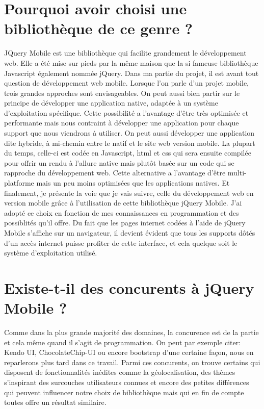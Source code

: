 \documentclass[a4paper,11pt,oneside]{sphinxmanual}
\begin{document}
\section{Pourquoi avoir choisi une bibliothèque de ce genre ?}
\label{presentation_jQM:pourquoi-avoir-choisi-une-bibliotheque-de-ce-genre}
JQuery Mobile est une bibliothèque qui facilite grandement le développement web.
Elle a été mise sur pieds par la même maison que la si fameuse bibliothèque
Javascript également nommée jQuery. Dans ma partie du projet, il est avant tout
question de développement web mobile. Lorsque l'on parle d'un projet mobile, trois
grandes approches sont envisageables. On peut aussi bien partir sur le principe
de développer une application native, adaptée à un système d'exploitation spécifique.
Cette possibilité a l'avantage d'être très optimisée et performante mais nous
contraint à développer une application pour chaque support que nous viendrons
à utiliser. On peut aussi développer une application dite hybride, à mi-chemin entre le natif et
le site web version mobile. La plupart du temps, celle-ci est codée en Javascript,
html et css qui sera ensuite compilée pour offrir un rendu à l'allure native mais
plutôt basée sur un code qui se rapproche du développement web. Cette alternative
a l'avantage d'être multi-platforme mais un peu moins optimisées que les
applications natives. Et finalement, je présente la voie que je vais suivre,
celle du développement web en version mobile grâce à l'utilisation de cette
bibliothèque jQuery Mobile. J'ai adopté ce choix en fonction de mes connaissances
en programmation et des possiblités qu'il offre. Du fait que les pages internet
codées à l'aide de jQuery Mobile s'affiche sur un navigateur, il devient
évident que tous les supports dôtés d'un accès internet puisse profiter de cette interface,
et cela quelque soit le système d'exploitation utilisé.


\section{Existe-t-il des concurents à jQuery Mobile ?}
\label{presentation_jQM:existe-t-il-des-concurents-a-jquery-mobile}
Comme dans la plus grande majorité des domaines, la concurence est de
la partie et cela même quand il s'agit de programmation. On peut par exemple citer:
Kendo UI, ChocolateChip-UI ou encore bootstrap d'une certaine façon, nous en
reparlerons plus tard dans ce travail. Parmi ces concurents, on trouve certains
qui disposent de fonctionnalités inédites comme la géolocalisation, des thèmes
s'inspirant des surcouches utilisateurs connues et encore des petites différences
qui peuvent influencer notre choix de bibliothèque mais qui en fin de compte
toutes offre un résultat similaire.
\end{document}
